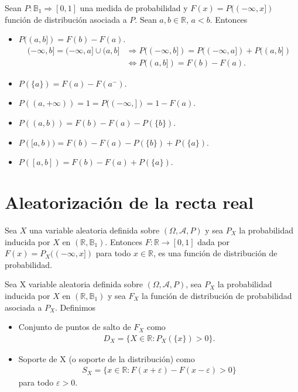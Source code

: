 \begin{obs}
Sean $P: \mathbb{B}_1 \Longrightarrow [0,1]$ una medida de probabilidad y $F(x) = P((-\infty,x])$ función de distribución asociada a $P$. Sean $a, b \in \mathbb{R}$, $a < b$. Entonces
\begin{itemize}
    \item $P((a,b]) = F(b) - F(a)$.
    \begin{align*}
        (-\infty,b] = (-\infty,a] \cup (a,b] &\Longrightarrow P((-\infty, b]) = P((-\infty,a]) + P((a,b]) \\
        & \Longleftrightarrow P((a,b]) = F(b) - F(a).
    \end{align*}
    \item $P(\{a\}) = F(a) - F(a^-)$.
    \item $P((a, +\infty)) = 1 = P((-\infty,]) = 1 - F(a)$.
    \item $P((a,b)) = F(b) - F(a) - P(\{b\})$.
    \item $P([a,b)) = F(b) - F(a) - P(\{b\}) + P(\{a\})$.
    \item $P([a,b]) = F(b) - F(a) + P(\{a\})$.
\end{itemize}
\end{obs}

\section{Aleatorización de la recta real}
Sea $X$ una variable aleatoria definida sobre $(\Omega, \mathcal{A}, P)$ y sea $P_X$ la probabilidad inducida por $X$ en $(\mathbb{R}, \mathbb{B}_1)$. Entonces $F: \mathbb{R} \longrightarrow [0,1]$ dada por $F(x) = P_X((-\infty,x])$ para todo $x \in \mathbb{R}$, es una función de distribución de probabilidad.

\begin{defi}
Sea X variable aleatoria definida sobre $(\Omega, \mathcal{A}, P)$, sea $P_X$ la probabilidad inducida por $X$ en $(\mathbb{R}, \mathbb{B}_1)$ y sea $F_X$ la función de distribución de probabilidad asociada a $P_X$. Definimos
\begin{itemize}
    \item Conjunto de puntos de salto de $F_X$ como
    \begin{align*}
        D_X = \{ X \in \mathbb{R} : P_X(\{x\}) > 0 \}.
    \end{align*}
    \item Soporte de X (o soporte de la distribución) como
    \begin{align*}
        S_X = \{x \in \mathbb{R} : F(x+\varepsilon) - F(x-\varepsilon) > 0 \}
    \end{align*}
    para todo $\varepsilon > 0$.
\end{itemize}
\end{defi}

